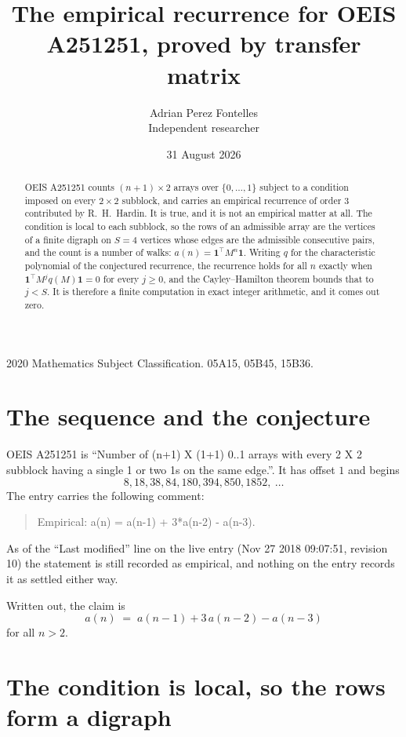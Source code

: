 \documentclass[11pt,a4paper]{article}
\title{The empirical recurrence for OEIS A251251, proved by transfer matrix}
\author{Adrian Perez Fontelles\\ \small Independent researcher}
\date{31 August 2026}
\theoremstyle{plain}
\theoremstyle{definition}
\begin{document}
\maketitle

\begin{abstract}
OEIS A251251 counts $(n+1)\times2$ arrays over $\{0,\dots,1\}$ subject to a condition imposed on
every $2\times2$ subblock, and carries an empirical recurrence of order $3$ contributed
by R.~H.~Hardin. It is true, and it is not an empirical matter at all. The condition is local
to each subblock, so the rows of an admissible array are the vertices of a finite digraph
on $S=4$ vertices whose edges are the admissible consecutive pairs, and the count is a
number of walks: $a(n)=\mathbf{1}^{\!\top}M^{n}\mathbf{1}$. Writing $q$
for the characteristic polynomial of the conjectured recurrence, the recurrence holds for all
$n$ exactly when $\mathbf{1}^{\!\top}M^{j}q(M)\mathbf{1}=0$ for every $j\ge0$, and the
Cayley--Hamilton theorem bounds that to $j<S$. It is therefore a finite computation in exact
integer arithmetic, and it comes out zero.
\end{abstract}

\noindent\small 2020 Mathematics Subject Classification. 05A15, 05B45, 15B36.\normalsize

\section{The sequence and the conjecture}

OEIS A251251 is ``Number of (n+1) X (1+1) 0..1 arrays with every 2 X 2 subblock having a single 1 or two 1s on the same edge.''. It has offset $1$ and begins
\[
8, 18, 38, 84, 180, 394, 850, 1852,\ \dots
\]
The entry carries the following comment:
\begin{quote}\small
Empirical: a(n) = a(n-1) + 3*a(n-2) - a(n-3).
\end{quote}
As of the ``Last modified'' line on the live entry (Nov 27 2018 09:07:51, revision 10) the statement is
still recorded as empirical, and nothing on the entry records it as settled either way.

Written out, the claim is
\begin{equation}\label{eq:conj}
a(n)\;=\;a(n-1) + 3\,a(n-2) - a(n-3)
\end{equation}
for all $n>2$.

\section{The condition is local, so the rows form a digraph}
\end{document}
